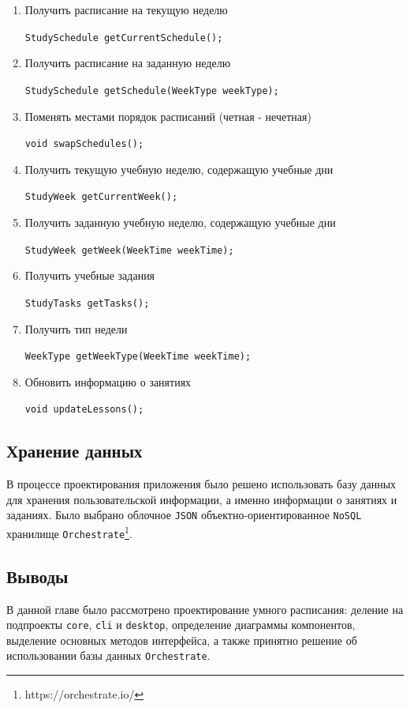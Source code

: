 \begin{enumerate}

    \item Получить расписание на текущую неделю

    \verb+StudySchedule getCurrentSchedule();+


    \item Получить расписание на заданную неделю

    \verb+StudySchedule getSchedule(WeekType weekType);+


    \item Поменять местами порядок расписаний (четная - нечетная)

    \verb+void swapSchedules();+


    \item Получить текущую учебную неделю, содержащую учебные дни

    \verb+StudyWeek getCurrentWeek();+


    \item Получить заданную учебную неделю, содержащую учебные дни

    \verb+StudyWeek getWeek(WeekTime weekTime);+


    \item Получить учебные задания

    \verb+StudyTasks getTasks();+


    \item Получить тип недели

    \verb+WeekType getWeekType(WeekTime weekTime);+

    
    \item Обновить информацию о занятиях

    \verb+void updateLessons();+
    
\end{enumerate}

\subsection{Хранение данных}
В процессе проектирования приложения было решено использовать базу данных для хранения пользовательской информации, а именно информации о занятиях и заданиях. Было выбрано  облочное \texttt{JSON} объектно-ориентированное \texttt{NoSQL} хранилище \texttt{Orchestrate}\footnote{https://orchestrate.io/}. 

\subsection{Выводы}
В данной главе было рассмотрено проектирование умного расписания: деление на подпроекты \texttt{core}, \texttt{cli} и \texttt{desktop}, определение диаграммы компонентов, выделение основных методов интерфейса, а также принятно решение об использовании базы данных \texttt{Orchestrate}.

